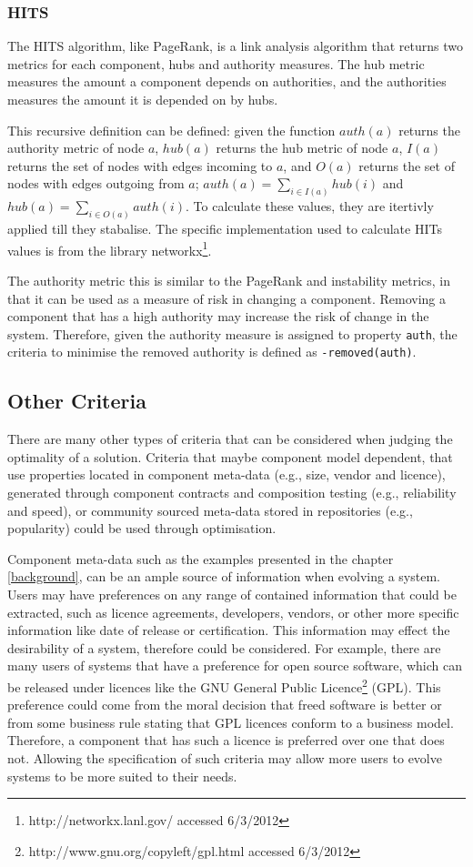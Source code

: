 \subsubsection{HITS}
The HITS algorithm, like PageRank, is a link analysis algorithm that returns two metrics for each component, hubs and authority measures.
The hub metric measures the amount a component depends on authorities, and the authorities measures the amount it is depended on by hubs.

This recursive definition can be defined:
given the function $auth(a)$ returns the authority metric of node $a$, $hub(a)$ returns the hub metric of node $a$,
$I(a)$ returns the set of nodes with edges incoming to $a$, and $O(a)$ returns the set of nodes with edges outgoing from $a$;
$auth(a) = \sum \limits_{i \in I(a)} hub(i)$ and  $hub(a) = \sum \limits_{i \in O(a)} auth(i)$.
To calculate these values, they are itertivly applied till they stabalise.
The specific implementation used to calculate HITs values is from the library networkx\footnote{http://networkx.lanl.gov/ accessed 6/3/2012}.

The authority metric this is similar to the PageRank and instability metrics, in that it can be used as a measure of risk in changing a component.
Removing a component that has a high authority may increase the risk of change in the system.
Therefore, given the authority measure is assigned to property \verb+auth+, the criteria to minimise the removed authority is defined as \verb!-removed(auth)!.

\subsection{Other Criteria}
There are many other types of criteria that can be considered when judging the optimality of a solution.
Criteria that maybe component model dependent, that use properties located in component meta-data (e.g., size, vendor and licence),
generated through component contracts and composition testing (e.g., reliability and speed),
or community sourced meta-data stored in repositories (e.g., popularity) could be used through optimisation.

Component meta-data such as the examples presented in the chapter \ref{background}, can be an ample source of information when evolving a system.
Users may have preferences on any range of contained information that could be extracted, such as licence agreements, developers, vendors,
or other more specific information like date of release or certification.
This information may effect the desirability of a system, therefore could be considered. 
For example, there are many users of systems that have a preference for open source software, 
which can be released under licences like the GNU General Public Licence\footnote{http://www.gnu.org/copyleft/gpl.html accessed 6/3/2012} (GPL).
This preference could come from the moral decision that freed software is better or from some business rule stating that GPL licences conform to a business model.
Therefore, a component that has such a licence is preferred over one that does not.
Allowing the specification of such criteria may allow more users to evolve systems to be more suited to their needs.

